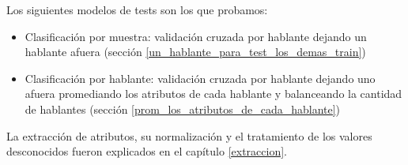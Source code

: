 Los siguientes modelos de tests son los que probamos:
\begin{itemize}
	\item Clasificación por muestra: validación cruzada por hablante dejando un hablante afuera (sección \ref{un_hablante_para_test_los_demas_train})
	\item Clasificación por hablante: validación cruzada por hablante dejando uno afuera promediando los atributos de cada hablante y balanceando la cantidad de hablantes (sección \ref{prom_los_atributos_de_cada_hablante})
\end{itemize}

La extracción de atributos, su normalización y el tratamiento de los valores desconocidos fueron explicados en el capítulo \ref{extraccion}.

%



%


%